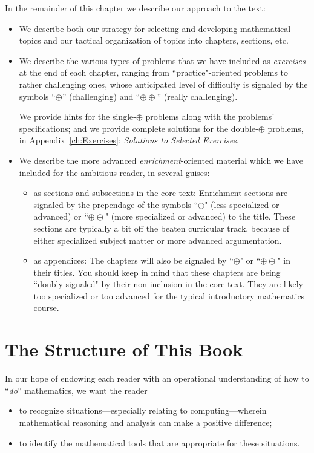 \bigskip

In the remainder of this chapter we describe our approach to the text:
\begin{itemize}
\item
We describe both our strategy for selecting and developing mathematical topics and our tactical organization of topics into chapters, sections, etc. 
\medskip\item
We describe the various types of problems that we have included as {\em exercises} at the end of each chapter, ranging from ``practice"-oriented problems to rather challenging ones, whose anticipated level of difficulty is signaled by the symbols ``$\oplus$'' (challenging) and ``$\oplus \oplus$'' (really challenging).

\smallskip

We provide hints for the single-$\oplus$ problems along with the problems' specifications; and we provide complete solutions for the double-$\oplus$ problems, in Appendix~\ref{ch:Exercises}: {\it Solutions to Selected Exercises}.
\medskip\item
We describe the more advanced {\em enrichment}-oriented material which we have included for the ambitious reader, in several guises:
  \begin{itemize}
  \item
as sections and subsections in the core text: Enrichment sections are signaled by the prependage of the symbols ``$\oplus$" (less specialized or advanced) or ``$\oplus \oplus$" (more specialized or advanced) to the title.  These sections are typically a bit off the beaten curricular track, because of either specialized subject matter or more advanced argumentation.
\medskip\item
as appendices: The chapters will also be signaled by ``$\oplus$" or ``$\oplus \oplus$" in their titles.  You should keep in mind that these chapters are being ``doubly signaled" by their non-inclusion in the core text.  They are likely too specialized or too advanced for the typical introductory mathematics course.
  \end{itemize}
\end{itemize}

\section{The Structure of This Book}
\label{sec:thisbook}

In our hope of endowing each reader with an operational understanding of how to ``{\em do}'' mathematics, we want the reader
\begin{itemize}
\item
to recognize situations---especially relating to computing---wherein mathematical reasoning and analysis can make a positive difference;
\medskip\item
to identify the mathematical tools that are appropriate for these situations.
\end{itemize}



